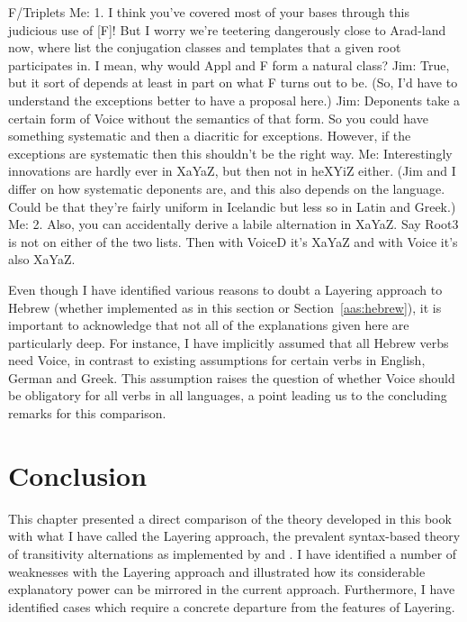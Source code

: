 F/Triplets
	Me: 1. I think you've covered most of your bases through this judicious use of [F]! But I worry we're teetering dangerously close to Arad-land now, where list the conjugation classes and templates that a given root participates in. I mean, why would Appl and F form a natural class?
		Jim: True, but it sort of depends at least in part on what F turns out to be. (So, I'd have to understand the exceptions better to have a proposal here.) 
		Jim: Deponents take a certain form of Voice without the semantics of that form. So you could have something systematic and then a diacritic for exceptions. However, if the exceptions are systematic then this shouldn't be the right way.
			Me: Interestingly innovations are hardly ever in XaYaZ, but then not in heXYiZ either.
		(Jim and I differ on how systematic deponents are, and this also depends on the language. Could be that they're fairly uniform in Icelandic but less so in Latin and Greek.)
	Me: 2. Also, you can accidentally derive a labile alternation in XaYaZ. Say Root3 is not on either of the two lists. Then with Voice{D} it's XaYaZ and with Voice{} it's also XaYaZ.




Even though I have identified various reasons to doubt a Layering approach to Hebrew (whether implemented as in this section or Section~\ref{aas:hebrew}), it is important to acknowledge that not all of the explanations given here are particularly deep. For instance, I have implicitly assumed that all Hebrew verbs need Voice, in contrast to existing assumptions for certain verbs in English, German and Greek. This assumption raises the question of whether Voice should be obligatory for all verbs in all languages, a point leading us to the concluding remarks for this comparison.


\section{Conclusion} \label{aas:conc}
This chapter presented a direct comparison of the theory developed in this book with what I have called the Layering approach, the prevalent syntax-based theory of transitivity alternations as implemented by \cite{schaefer08,schaefer17oup} and \cite{layering15}. I have identified a number of weaknesses with the Layering approach and illustrated how its considerable explanatory power can be mirrored in the current approach. Furthermore, I have identified cases which require a concrete departure from the features of Layering.

